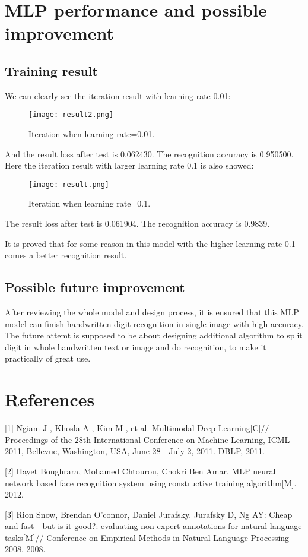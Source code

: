 \documentclass{article}
\begin{document}
\section{MLP performance and possible improvement}
\label{others}


\subsection{Training result}

We can clearly see the iteration result with learning rate 0.01:
\begin{figure}[htb]
	\centering	
	\texttt{[image: result2.png]}
	\caption{Iteration when learning rate=0.01.}
\end{figure}

And the result loss after test is 0.062430. The recognition accuracy is  0.950500.\\

Here the iteration result with larger learning rate 0.1 is also showed:

\begin{figure}[htb]
	\centering	
	\texttt{[image: result.png]}
	\caption{Iteration when learning rate=0.1.}
\end{figure}

The result loss after test is 0.061904. The recognition accuracy is 0.9839.

It is proved that for some reason in this model with the higher learning rate 0.1 comes a better recognition result.

\subsection{Possible future improvement}

After reviewing the whole model and design process, it is ensured that this MLP model can finish handwritten digit recognition in single image with high accuracy.
The future attemt is supposed to be about designing additional algorithm to split digit in whole handwritten text or image and do recognition, to make it practically of great use.

\section*{References}

\medskip

\small

[1] Ngiam J , Khosla A , Kim M , et al. Multimodal Deep Learning[C]// Proceedings of the 28th International Conference on Machine Learning, ICML 2011, Bellevue, Washington, USA, June 28 - July 2, 2011. DBLP, 2011.

[2] Hayet Boughrara, Mohamed Chtourou, Chokri Ben Amar. MLP neural network based face recognition system using constructive training algorithm[M]. 2012.

[3] Rion Snow, Brendan O'connor, Daniel Jurafsky. Jurafsky D, Ng AY: Cheap and fast—but is it good?: evaluating non-expert annotations for natural language tasks[M]// Conference on Empirical Methods in Natural Language Processing 2008. 2008.
\end{document}
